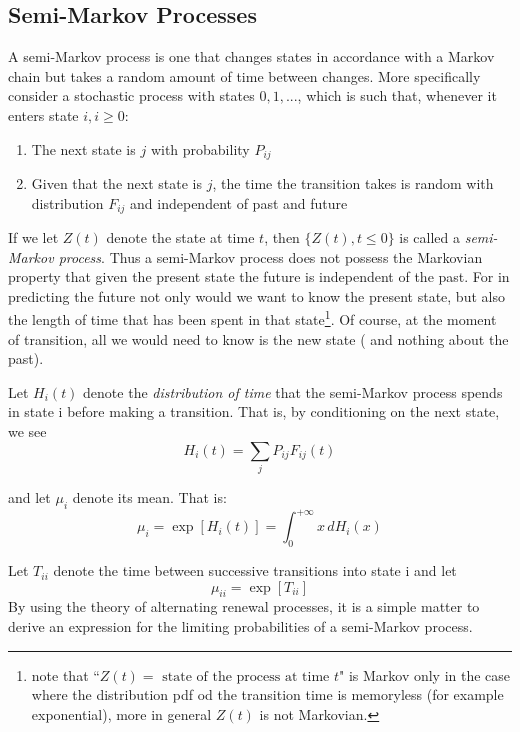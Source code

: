 \subsection{Semi-Markov Processes}
A semi-Markov process is one that changes states in accordance with a Markov
chain but takes a random amount of time between changes. More specifically
consider a stochastic process with states $0, 1, ...  $, which is such that, whenever
it enters state $i, i\geq 0$:
\begin{enumerate}
	\item The next state is $j$ with probability $P_{ij}$
	\item Given that the next state is $j$, the time the transition takes is random with distribution $F_{ij}$ and independent of past and future
\end{enumerate}
If we let $Z(t)$ denote the state at time $t$, then $\{Z(t), t\leq 0\}$ is called a \emph{semi-Markov
	process}.
Thus a semi-Markov process does not possess the Markovian property that
given the present state the future is independent of the past. For in predicting
the future not only would we want to know the present state, but also the
length of time that has been spent in that state\footnote{note that ``$Z(t) = \mbox{ state of the process at time } t$" is Markov only in the case where the distribution pdf od the transition time is memoryless (for example exponential), more in general $Z(t)$ is not Markovian.}. Of course, at the moment of transition, all we would need to know is the new state ( and nothing about
the past). %

Let $H_i(t)$ denote the \emph{distribution of time} that the semi-Markov process spends
in state i before making a transition. That is, by conditioning on the next
state, we see
\begin{equation}
H_i(t) = \sum_j P_{ij} F_{ij}(t)
\end{equation}

and let $\mu_i$ denote its mean. That is:
\begin{equation}
\mu_i = \exp[H_i(t)] = \int_{0}^{+\infty}x \,dH_i(x)
\end{equation}

Let $T_{ii}$ denote the time between successive transitions into state i and let
\begin{equation}
\mu_{ii}=\exp [T_{ii}]
\end{equation}
By using the theory of alternating renewal processes, it is a
simple matter to derive an expression for the limiting probabilities of a semi-Markov
process.


